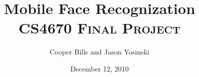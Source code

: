 \documentclass[11pt,letterpaper]{article}
\title{Mobile Face Recognization\\
\textsc{\normalsize CS4670 Final Project}}
\author{Cooper Bills and Jason Yosinski \\
\code{\{csb88,jy495\}@cornell.edu}}
\date{December 12, 2010}
\begin{document}
\maketitle

\begin{abstract}

\end{abstract}









\end{document}
